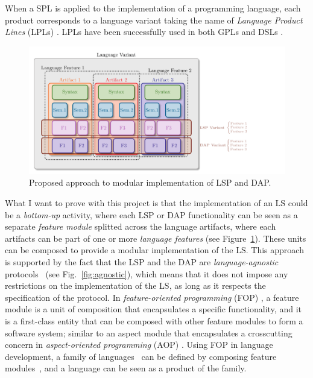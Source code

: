 When a SPL is applied to the implementation of a programming language, each product corresponds to a language variant \cite{Cazzola15f} taking the name of \textit{Language Product Lines} (LPLs) \cite{Cazzola15f}. LPLs have been successfully used in both GPLs \cite{Cazzola16, Cazzola16i, Cazzola15f} and DSLs \cite{Haugen08, Cazzola14e, White09}.
\hfill \break
\begin{figure}[t]
    \centering
    \includegraphics[width=1\linewidth]{figs/module_with_lsp.pdf}
    \caption{Proposed approach to modular implementation of LSP and DAP.}
    \label{fig:proposed}
\end{figure}
What I want to prove with this project is that the implementation of an LS could be a \textit{bottom-up} activity, where each LSP or DAP functionality can be seen as a separate \textit{feature module} \cite{Batory04, Kastner11} splitted across the language artifacts, where each artifacts can be part of one or more \textit{language features} (see Figure~\ref{fig:proposed}). These units can be composed to provide a modular implementation of the LS. This approach is supported by the fact that the LSP and the DAP are \textit{language-agnostic} protocols~\cite{Niephaus20, Rodriguez-Echeverria18} (see Fig.~\ref{fig:agnostic}), which means that it does not impose any restrictions on the implementation of the LS, as long as it respects the specification of the protocol.
In \textit{feature-oriented programming} (FOP) \cite{Apel13, Czarnecki04, Prehofer01}, a feature module is a unit of composition that encapsulates a specific functionality, and it is a first-class entity that can be composed with other feature modules to form a software system; similar to an aspect module that encapsulates a crosscutting concern in \textit{aspect-oriented programming} (AOP) \cite{Kiczales01, Kiczales97, Laddad03}. Using FOP in language development, a family of languages~\cite{Liebig13} can be defined by composing feature modules~\cite{Wende09}, and a language can be seen as a product of the family.
